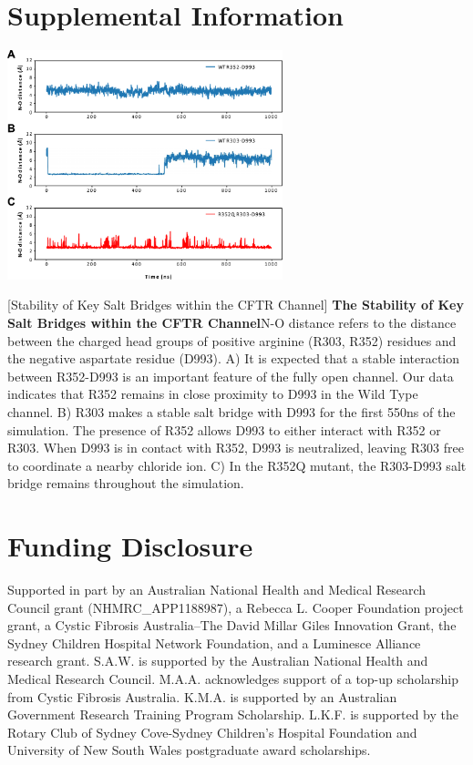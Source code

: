 \section{Supplemental Information}
\renewcommand{\thefigure}{\arabic{chapter}.E\arabic{figure}}

\setcounter{figure}{3}

\begin{center}
	\includegraphics[width=0.6\textwidth]{figures/R352Q/R352Q_E4.pdf}
\end{center}
\captionsetup{singlelinecheck = false, justification=raggedright}
\begingroup
{}[Stability of Key Salt Bridges within the CFTR Channel] {\textbf{The Stability of Key Salt Bridges within the CFTR Channel}}{N-O distance refers to the distance between the charged head groups of positive arginine (R303, R352) residues and the negative aspartate residue (D993). A) It is expected that a stable interaction between R352-D993 is an important feature of the fully open channel. Our data indicates that R352 remains in close proximity to D993 in the Wild Type channel. B) R303 makes a stable salt bridge with D993 for the first 550ns of the simulation. The presence of R352 allows D993 to either interact with R352 or R303. When D993 is in contact with R352, D993 is neutralized, leaving R303 free to coordinate a nearby chloride ion. C) In the R352Q mutant, the R303-D993 salt bridge remains throughout the simulation.}
\label{R352Q_E4}
\endgroup
\section{Funding Disclosure}
Supported in part by an Australian National Health and Medical Research Council grant (NHMRC_APP1188987), a Rebecca L. Cooper Foundation project grant, a Cystic Fibrosis Australia–The David Millar Giles Innovation Grant, the Sydney Children Hospital Network Foundation, and a Luminesce Alliance research grant. S.A.W. is supported by the Australian National Health and Medical Research Council. M.A.A. acknowledges support of a top-up scholarship from Cystic Fibrosis Australia. K.M.A. is supported by an Australian Government Research Training Program Scholarship. L.K.F. is supported by the Rotary Club of Sydney Cove-Sydney Children’s Hospital Foundation and University of New South Wales postgraduate award scholarships.

